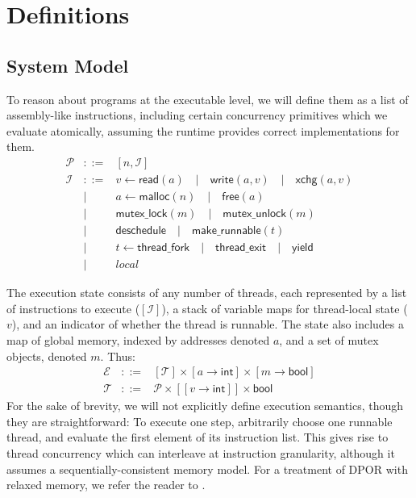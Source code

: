 \section{Definitions}

\subsection{System Model}

To reason about programs at the executable level, we will define them as a list of assembly-like instructions,
including certain concurrency primitives which we evaluate atomically, assuming the runtime provides correct implementations for them.
\begin{eqnarray*}
	\mathcal{P} &::=& [n, \mathcal{I}] \\
	\mathcal{I} &::=& v \leftarrow \mathsf{read}(a) \quad | \quad \mathsf{write}(a,v) \quad | \quad \mathsf{xchg}(a,v) \\
	&|& a \leftarrow \mathsf{malloc}(n) \quad | \quad \mathsf{free}(a) \\
	&|& \mathsf{mutex\_lock}(m) \quad | \quad \mathsf{mutex\_unlock}(m) \\
	&|& \mathsf{deschedule} \quad | \quad \mathsf{make\_runnable}(t) \\
	&|& t \leftarrow \mathsf{thread\_fork} \quad | \quad \mathsf{thread\_exit} \quad | \quad \mathsf{yield} \\
	&|& \textit{local}
\end{eqnarray*}

The execution state consists of any number of threads, each represented by a list of instructions to execute ($[\mathcal{I}]$),
a stack of variable maps for thread-local state ($v$),
and an indicator of whether the thread is runnable.
The state also includes a map of global memory, indexed by addresses denoted $a$,
and a set of mutex objects, denoted $m$. Thus:
\begin{eqnarray*}
	\mathcal{E} &::=& [\mathcal{T}] \times [a \rightarrow \mathsf{int}] \times [m \rightarrow \mathsf{bool}] \\
	\mathcal{T} &::=& \mathcal{P} \times [[v \rightarrow \mathsf{int}]] \times \mathsf{bool}
\end{eqnarray*}
For the sake of brevity, we will not explicitly define execution semantics, though they are straightforward:
To execute one step, arbitrarily choose one runnable thread, and evaluate the first element of its instruction list.
This gives rise to thread concurrency which can interleave at instruction granularity,
although it assumes a sequentially-consistent memory model. For a treatment of DPOR with relaxed memory, we refer the reader to \cite{tsopso}.

